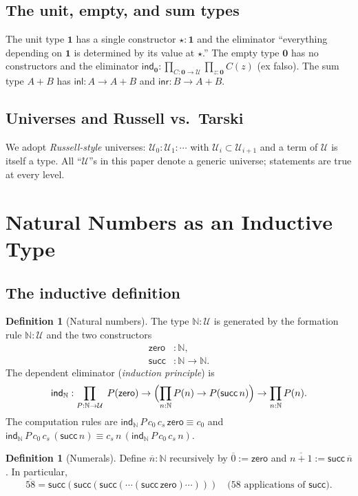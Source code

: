 \documentclass[12pt]{article}
\theoremstyle{definition}
\newtheorem{definition}[theorem]{Definition}
\theoremstyle{remark}
\newcommand{\U}{\mathcal{U}}
\newcommand{\N}{\mathbb{N}}
\newcommand{\zero}{\mathsf{zero}}
\newcommand{\suc}{\mathsf{succ}}
\newcommand{\inl}{\mathsf{inl}}
\newcommand{\inr}{\mathsf{inr}}
\begin{document}
\subsection{The unit, empty, and sum types}

The unit type $\mathbf{1}$ has a single constructor $\star : \mathbf{1}$ and
the eliminator ``everything depending on $\mathbf{1}$ is determined by its
value at $\star$.'' The empty type $\mathbf{0}$ has no constructors and the
eliminator $\mathsf{ind}_{\mathbf{0}} : \prod_{C : \mathbf{0} \to \U}
\prod_{z : \mathbf{0}} C(z)$ (ex falso). The sum type $A + B$ has
$\inl : A \to A + B$ and $\inr : B \to A + B$.

\subsection{Universes and Russell vs.\ Tarski}
\label{sec:universes}

We adopt \emph{Russell-style} universes: $\U_0 : \U_1 : \cdots$ with
$\U_i \subset \U_{i+1}$ and a term of $\U$ is itself a type. All ``$\U$''s
in this paper denote a generic universe; statements are true at every level.

\section{Natural Numbers as an Inductive Type}
\label{sec:nat}

\subsection{The inductive definition}

\begin{definition}[Natural numbers]
\label{def:nat}
The type $\N : \U$ is generated by the formation rule $\N : \U$ and the two
constructors
\begin{align*}
\zero &: \N, \\
\suc &: \N \to \N.
\end{align*}
The dependent eliminator (\emph{induction principle}) is
\[
\mathsf{ind}_\N : \prod_{P : \N \to \U}\;
P(\zero) \to
\Bigl(\prod_{n : \N} P(n) \to P(\suc\,n)\Bigr) \to
\prod_{n : \N} P(n).
\]
The computation rules are
$\mathsf{ind}_\N\,P\,c_0\,c_s\,\zero \equiv c_0$ and
$\mathsf{ind}_\N\,P\,c_0\,c_s\,(\suc\,n) \equiv
c_s\,n\,(\mathsf{ind}_\N\,P\,c_0\,c_s\,n)$.
\end{definition}

\begin{definition}[Numerals]
\label{def:numerals}
Define $\overline{n} : \N$ recursively by $\overline{0} := \zero$ and
$\overline{n+1} := \suc\,\overline{n}$. In particular,
\[
\overline{58} = \suc(\suc(\suc(\cdots(\suc\,\zero)\cdots)))
\quad\text{(58 applications of \(\suc\)).}
\]
\end{definition}
\end{document}
